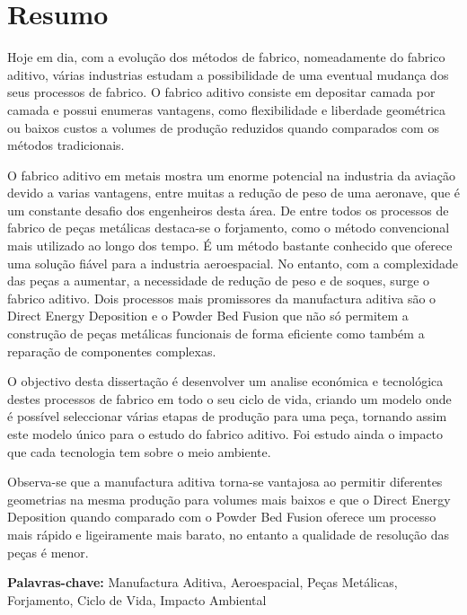 
\section*{Resumo}

\vspace{50}
\hspace{10} Hoje em dia, com a evolução dos métodos de fabrico, nomeadamente do fabrico aditivo, várias industrias estudam a possibilidade de uma eventual mudança dos seus processos de fabrico. O fabrico aditivo consiste em depositar camada por camada e possui enumeras vantagens, como flexibilidade e liberdade geométrica ou baixos custos a volumes de produção reduzidos quando comparados com os métodos tradicionais.\par
 O fabrico aditivo em metais mostra um enorme potencial na industria da aviação devido a varias vantagens, entre muitas a redução de peso de uma aeronave, que é um constante desafio dos engenheiros desta área. De entre todos os processos de fabrico de peças metálicas destaca-se o forjamento, como o método convencional mais utilizado ao longo dos tempo. É um método bastante conhecido que oferece uma solução fiável para a industria aeroespacial. No entanto, com a complexidade das peças a aumentar, a necessidade de redução de peso e de soques, surge o fabrico aditivo. Dois processos mais promissores da manufactura aditiva são o Direct Energy Deposition e o Powder Bed Fusion que não só permitem a construção de peças metálicas funcionais de forma eficiente como também a reparação de componentes complexas.\par
 O objectivo desta dissertação é desenvolver um analise económica e tecnológica destes processos de fabrico em todo o seu ciclo de vida, criando um modelo onde é possível seleccionar várias etapas de produção para uma peça, tornando assim este modelo único para o estudo do fabrico aditivo. Foi estudo ainda o impacto que cada tecnologia tem sobre o meio ambiente.\par
 Observa-se que a manufactura aditiva torna-se vantajosa ao permitir diferentes geometrias na mesma produção para volumes mais baixos e que o Direct Energy Deposition quando comparado com o Powder Bed Fusion oferece um processo mais rápido e ligeiramente mais barato, no entanto a qualidade de resolução das peças é menor.

\vfill

\textbf{\Large Palavras-chave:} Manufactura Aditiva, Aeroespacial, Peças Metálicas, Forjamento, Ciclo de Vida, Impacto Ambiental

